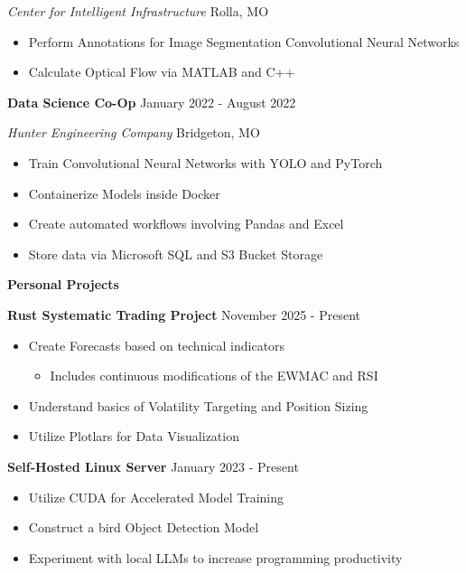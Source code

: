 \documentclass[11pt]{article}
\begin{document}
\textsl{Center for Intelligent Infrastructure} \hfill Rolla, MO
\begin{itemize}[noitemsep, topsep=0pt, partopsep=0pt, parsep=0pt, itemsep=0pt]
    \item Perform Annotations for Image Segmentation Convolutional Neural Networks
    \item Calculate Optical Flow via MATLAB and C++
\end{itemize}


\textbf{Data Science Co-Op} \hfill January 2022 - August 2022

\textsl{Hunter Engineering Company} \hfill Bridgeton, MO
\begin{itemize}[noitemsep, topsep=0pt, partopsep=0pt, parsep=0pt, itemsep=0pt]
    \item Train Convolutional Neural Networks with YOLO and PyTorch
    \item Containerize Models inside Docker
    \item Create automated workflows involving Pandas and Excel
    \item Store data via Microsoft SQL and S3 Bucket Storage
\end{itemize}


\begin{center}
    \textbf{Personal Projects}
\end{center}

\textbf{Rust Systematic Trading Project} \hfill November 2025 - Present
\begin{itemize}[noitemsep, topsep=0pt, partopsep=0pt, parsep=0pt, itemsep=0pt]
    \item Create Forecasts based on technical indicators
    \begin{itemize}[noitemsep, topsep=0pt, partopsep=0pt, parsep=0pt, itemsep=0pt]
        \item Includes continuous modifications of the EWMAC and RSI
    \end{itemize}
    \item Understand basics of Volatility Targeting and Position Sizing
    \item Utilize Plotlars for Data Visualization
\end{itemize}

\textbf{Self-Hosted Linux Server} \hfill January 2023 - Present
\begin{itemize}[noitemsep, topsep=0pt, partopsep=0pt, parsep=0pt, itemsep=0pt]
    \item Utilize CUDA for Accelerated Model Training
    \item Construct a bird Object Detection Model
    \item Experiment with local LLMs to increase programming productivity
\end{itemize}
\end{document}
